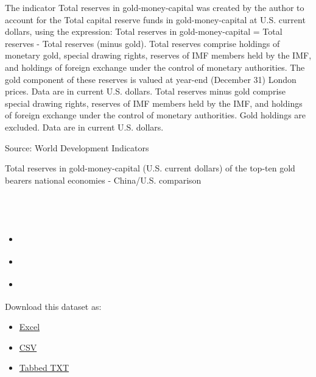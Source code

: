 \documentclass[
]{article}
\providecommand{\tightlist}{%
  \setlength{\itemsep}{0pt}\setlength{\parskip}{0pt}}
\begin{document}
The indicator Total reserves in gold-money-capital was created by the
author to account for the Total capital reserve funds in
gold-money-capital at U.S. current dollars, using the expression: Total
reserves in gold-money-capital = Total reserves - Total reserves (minus
gold). Total reserves comprise holdings of monetary gold, special
drawing rights, reserves of IMF members held by the IMF, and holdings of
foreign exchange under the control of monetary authorities. The gold
component of these reserves is valued at year-end (December 31) London
prices. Data are in current U.S. dollars. Total reserves minus gold
comprise special drawing rights, reserves of IMF members held by the
IMF, and holdings of foreign exchange under the control of monetary
authorities. Gold holdings are excluded. Data are in current U.S.
dollars.

Source: World Development Indicators

\hypertarget{widgetTitle}{}

\hypertarget{widgetDesc}{}
Total reserves in gold-money-capital (U.S. current dollars) of the
top-ten gold bearers national economies - China/U.S. comparison

\hypertarget{widgetpreview}{}
\hypertarget{widgetpreviewcontent}{}
\hypertarget{divtoolbar}{}
\hypertarget{section}{%
\subsection{\texorpdfstring{\protect\hypertarget{lblTitle}{}{~}}{~}}\label{section}}

\begin{itemize}
\tightlist
\item
  \protect\hypertarget{aAboutReport}{\href{../../../views/reports/\#widget-description-panel}{{}}}
\item
  \protect\hypertarget{aDownloadData}{\href{../../../views/reports/\#widget-download-panel}{{}}}
\item
  \protect\hypertarget{aShareQuery}{\href{../../../views/reports/\#widget-share-panel}{{}}}
\end{itemize}

\hypertarget{widget-description-panel}{}

\hypertarget{widget-download-panel}{}
Download this dataset as:

\begin{itemize}
\tightlist
\item
  \protect\hyperlink{}{{}\protect\hypertarget{sExcel}{}{Excel}}
\item
  \protect\hyperlink{}{{}\protect\hypertarget{sCSV}{}{CSV}}
\item
  \protect\hyperlink{}{{}\protect\hypertarget{sTabbedTXT}{}{Tabbed TXT}}
\end{itemize}
\end{document}
